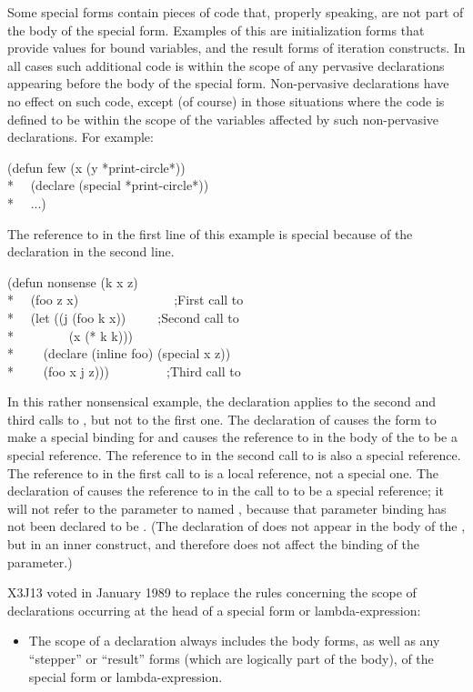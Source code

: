 \begin{defspec}
Some special forms contain pieces of code that, properly speaking,
are not part of the body of the special form.  Examples of this
are initialization forms that provide values for bound variables,
and the result forms of iteration constructs.
In all cases such additional code is within the scope of any pervasive
declarations appearing before the body of the special form.
Non-pervasive declarations have no effect on such code, except (of course)
in those situations where the code is defined to be within the scope
of the variables affected by such non-pervasive declarations.
For example:
\begin{lisp}
(defun few (x  (y *print-circle*)) \\*
~~(declare (special *print-circle*)) \\*
~~...)
\end{lisp}
The reference to  in the first line of this example is special
because of the declaration in the second line.
\begin{lisp}
(defun nonsense (k x z) \\*
~~(foo z x)~~~~~~~~~~~~~~~;{\rm First call to } \\*
~~(let ((j (foo k x))~~~~~;{\rm Second call to } \\*
~~~~~~~~(x (* k k))) \\*
~~~~(declare (inline foo) (special x z)) \\*
~~~~(foo x j z)))~~~~~~~~~;{\rm Third call to }
\end{lisp}
In this rather nonsensical example,
the  declaration applies to the
second and third calls to , but not to the first one.
The  declaration of  causes the  form
to make a special binding for  and causes the reference to 
in the body of the  to be a special reference.
The reference to  in the second call to  is also a special
reference.
The reference to  in the first call to  is a local
reference, not a special one.  The  declaration of 
causes the reference to  in the call
to  to be a special reference; it will not
refer to the parameter to  named , because that
parameter binding has not been declared to be .
(The  declaration of  does not appear in the body
of the , but in an inner construct, and therefore does not
affect the binding of the parameter.)

\begin{new}
X3J13 voted in January 1989
to replace the rules concerning the scope of
declarations occurring at the head of a special form or lambda-expression:
\begin{itemize}
\item The scope of a declaration always includes the body forms, as well as any
``stepper'' or ``result'' forms (which are logically part of the body), of the
special form or lambda-expression.


\end{itemize}
\end{new}
\end{defspec}
